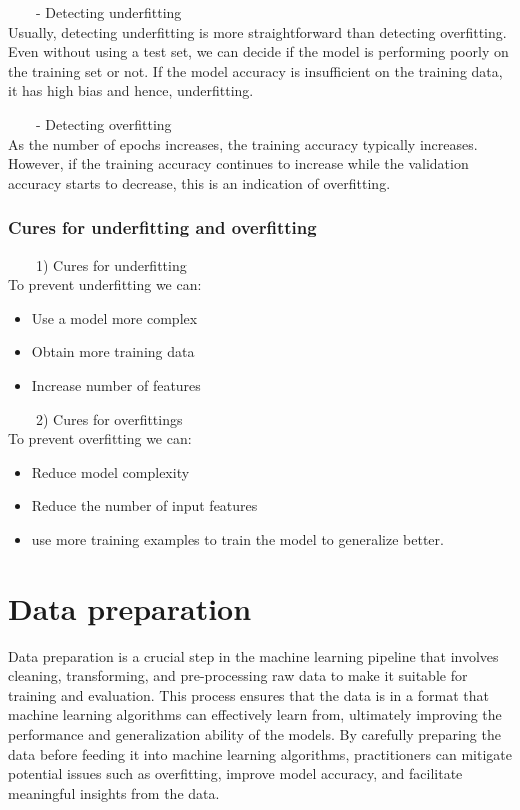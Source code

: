 \documentclass[
]{book}
\providecommand{\tightlist}{%
  \setlength{\itemsep}{0pt}\setlength{\parskip}{0pt}}
\begin{document}
~~~~- Detecting underfitting\\
Usually, detecting underfitting is more straightforward than detecting overfitting. Even without using a test set, we can decide if the model is performing poorly on the training set or not. If the model accuracy is insufficient on the training data, it has high bias and hence, underfitting.

~~~~- Detecting overfitting\\
As the number of epochs increases, the training accuracy typically increases. However, if the training accuracy continues to increase while the validation accuracy starts to decrease, this is an indication of overfitting.

\hypertarget{cures-for-underfitting-and-overfitting}{%
\subsection{Cures for underfitting and overfitting}\label{cures-for-underfitting-and-overfitting}}

~~~~1) Cures for underfitting\\
To prevent underfitting we can:

\begin{itemize}
\tightlist
\item
  Use a model more complex
\item
  Obtain more training data
\item
  Increase number of features
\end{itemize}

~~~~2) Cures for overfittings\\
To prevent overfitting we can:

\begin{itemize}
\tightlist
\item
  Reduce model complexity
\item
  Reduce the number of input features
\item
  use more training examples to train the model to generalize better.
\end{itemize}

\hypertarget{data-preparation}{%
\chapter{Data preparation}\label{data-preparation}}

Data preparation is a crucial step in the machine learning pipeline that involves cleaning, transforming, and pre-processing raw data to make it suitable for training and evaluation. This process ensures that the data is in a format that machine learning algorithms can effectively learn from, ultimately improving the performance and generalization ability of the models. By carefully preparing the data before feeding it into machine learning algorithms, practitioners can mitigate potential issues such as overfitting, improve model accuracy, and facilitate meaningful insights from the data.
\end{document}
